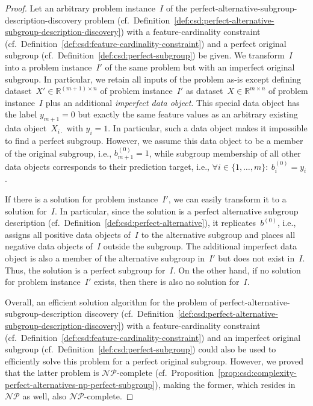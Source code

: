 \documentclass{article}
\theoremstyle{definition}
\begin{document}
\begin{proof}
Let an arbitrary problem instance~$I$ of the perfect-alternative-subgroup-description-discovery problem (cf.~Definition~\ref{def:csd:perfect-alternative-subgroup-description-discovery}) with a feature-cardinality constraint (cf.~Definition~\ref{def:csd:feature-cardinality-constraint}) and a perfect original subgroup (cf.~Definition~\ref{def:csd:perfect-subgroup}) be given.
We transform~$I$ into a problem instance~$I'$ of the same problem but with an imperfect original subgroup.
In particular, we retain all inputs of the problem as-is except defining dataset~$X' \in \mathbb{R}^{(m + 1) \times n}$ of problem instance~$I'$ as dataset~$X \in \mathbb{R}^{m \times n}$ of problem instance~$I$ plus an additional \emph{imperfect data object}.
This special data object has the label $y_{m+1}=0$ but exactly the same feature values as an arbitrary existing data object~$X_{i\cdot}$ with $y_i=1$.
In particular, such a data object makes it impossible to find a perfect subgroup.
However, we assume this data object to be a member of the original subgroup, i.e., $b^{(0)}_{m+1} = 1$, while subgroup membership of all other data objects corresponds to their prediction target, i.e., $\forall i \in \{1, \dots, m\}:~ b^{(0)}_i = y_i$.

If there is a solution for problem instance~$I'$, we can easily transform it to a solution for~$I$.
In particular, since the solution is a perfect alternative subgroup description (cf.~Definition~\ref{def:csd:perfect-alternative}), it replicates~$b^{(0)}$, i.e., assigns all positive data objects of~$I$ to the alternative subgroup and places all negative data objects of~$I$ outside the subgroup.
The additional imperfect data object is also a member of the alternative subgroup in~$I'$ but does not exist in~$I$.
Thus, the solution is a perfect subgroup for~$I$.
On the other hand, if no solution for problem instance~$I'$ exists, then there is also no solution for~$I$.

Overall, an efficient solution algorithm for the problem of perfect-alternative-subgroup-description discovery (cf.~Definition~\ref{def:csd:perfect-alternative-subgroup-description-discovery}) with a feature-cardinality constraint (cf.~Definition~\ref{def:csd:feature-cardinality-constraint}) and an imperfect original subgroup (cf.~Definition~\ref{def:csd:perfect-subgroup}) could also be used to efficiently solve this problem for a perfect original subgroup.
However, we proved that the latter problem is $\mathcal{NP}$-complete (cf.~Proposition~\ref{prop:csd:complexity-perfect-alternatives-np-perfect-subgroup}), making the former, which resides in $\mathcal{NP}$ as well, also $\mathcal{NP}$-complete.
\end{proof}
\end{document}

